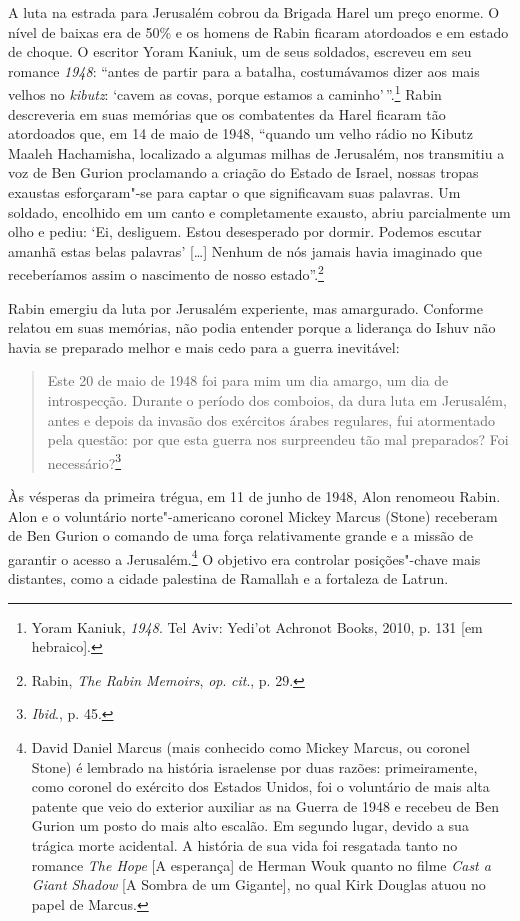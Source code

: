 A luta na estrada para Jerusalém cobrou da Brigada Harel um preço
enorme. O nível de baixas era de 50\% e os homens de Rabin ficaram
atordoados e em estado de choque. O escritor Yoram Kaniuk, um de seus
soldados, escreveu em seu romance \emph{1948}: ``antes de partir para a
batalha, costumávamos dizer aos mais velhos no \emph{kibutz}: `cavem as covas,
porque estamos a caminho'\,''.\footnote{Yoram Kaniuk, \emph{1948}. Tel Aviv: Yedi'ot Achronot Books, 2010, p. 131 {[}em hebraico{]}.} Rabin descreveria em suas
memórias que os combatentes da Harel ficaram tão atordoados que, em 14
de maio de 1948, ``quando um velho rádio no Kibutz Maaleh Hachamisha,
localizado a algumas milhas de Jerusalém, nos transmitiu a voz de Ben
Gurion proclamando a criação do Estado de Israel, nossas tropas exaustas
esforçaram"-se para captar o que significavam suas palavras. Um soldado,
encolhido em um canto e completamente exausto, abriu parcialmente um olho e
pediu: `Ei, desliguem. Estou desesperado por dormir. Podemos escutar
amanhã estas belas palavras' {[}\ldots{}{]} Nenhum de nós jamais havia imaginado que
receberíamos assim o nascimento de nosso estado''.\footnote{Rabin,
\emph{The Rabin Memoirs}, \emph{op}. \emph{cit}., p. 29.}

Rabin emergiu da luta por Jerusalém experiente, mas amargurado. Conforme
relatou em suas memórias, não podia entender porque a liderança do
Ishuv não havia se preparado melhor e mais cedo para a guerra
inevitável: 

\begin{quote}
Este 20 de maio de 1948 foi para mim um dia amargo, um dia
de introspecção. Durante o período dos comboios, da dura luta em
Jerusalém, antes e depois da invasão dos exércitos árabes regulares, fui
atormentado pela questão: por que esta guerra nos surpreendeu tão mal
preparados? Foi necessário?\footnote{\emph{Ibid}., p. 45.}
\end{quote}

Às vésperas da primeira trégua, em 11 de junho de 1948, Alon renomeou
Rabin. Alon e o voluntário norte"-americano coronel Mickey Marcus (Stone)
receberam de Ben Gurion o comando de uma força relativamente grande e a
missão de garantir o acesso a Jerusalém.\footnote{David Daniel Marcus 
(mais conhecido como Mickey Marcus, ou coronel Stone) é lembrado na história israelense
por duas razões: primeiramente, como coronel do exército
dos Estados Unidos, foi o voluntário de mais alta patente que veio do
exterior auxiliar as  na Guerra de 1948 e recebeu de Ben Gurion um
posto do mais alto escalão. Em segundo lugar, devido a sua trágica morte
acidental. A história de sua vida foi resgatada tanto no romance \emph{The Hope} {[}A esperança{]} de
Herman Wouk quanto no filme \emph{Cast a Giant Shadow} {[}A Sombra de um
Gigante{]}, no qual Kirk Douglas atuou no papel de Marcus.} O objetivo era controlar
posições"-chave mais distantes, como a cidade palestina de Ramallah e a
fortaleza de Latrun.

